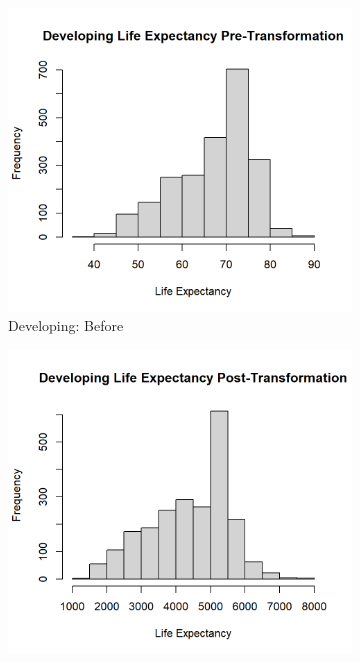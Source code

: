 \documentclass[12pt]{article}
\begin{document}
\begin{figure}[h]
  \centering
  \begin{subfigure}{0.5\textwidth}
    \centering
    \includegraphics[width=\linewidth]{images/figure_4a.png}
    \caption{Developing: Before}
    \label{subfig:image1}
  \end{subfigure}%
  \begin{subfigure}{0.5\textwidth}
    \centering
    \includegraphics[width=\linewidth]{images/figure_4b.png}

\end{subfigure}
\end{figure}
\end{document}
